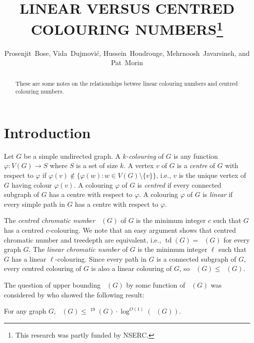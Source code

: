 \documentclass{patmorin}
\title{\MakeUppercase{Linear versus centred Colouring Numbers}\thanks{This research was partly funded by NSERC.}}
\author{Prosenjit~Bose, Vida~Dujmović, Hussein~Houdrouge, Mehrnoosh~Javarsineh, and Pat~Morin}
\date{}
\DeclareMathOperator{\td}{td}
\DeclareMathOperator{\chicen}{\chi_{\mathrm{cen}}}
\DeclareMathOperator{\chilin}{\chi_{\mathrm{lin}}}
\begin{document}
\maketitle
\renewcommand{\E}{\mathbb{E}}
\renewcommand{\Pr}{\mathbb{P}}

\begin{abstract}
    These are some notes on the relationships betwee linear colouring numbers and centred colouring numbers.
\end{abstract}

\section{Introduction}

Let $G$ be a simple undirected graph.  A \emph{$k$-colouring} of $G$ is any function $\varphi:V(G)\to S$ where $S$ is a set of size $k$.  A vertex $v$ of $G$ is a \emph{centre} of $G$ with respect to $\varphi$ if $\varphi(v)\not\in\{\varphi(w):w\in V(G)\setminus\{v\}\}$, i.e., $v$ is the unique vertex of $G$ having colour $\varphi(v)$.  A colouring $\varphi$ of $G$ is \emph{centred} if every connected subgraph of $G$ has a centre with respect to $\varphi$. A colouring $\varphi$ of $G$ is \emph{linear} if every simple path in $G$ has a centre with respect to $\varphi$.

The \emph{centred chromatic number} $\chicen(G)$ of $G$ is the minimum integer $c$ such that $G$ has a centred $c$-colouring.  We note that an easy argument shows that centred chromatic number and treedepth are equivalent, i.e., $\td(G)=\chicen(G)$ for every graph $G$. The \emph{linear chromatic number} of $G$ is the minimum integer $\ell$ such that $G$ has a linear $\ell$-colouring.  Since every path in $G$ is a connected subgraph of $G$, every centred colouring of $G$ is also a linear colouring of $G$, so $\chilin(G)\le\chicen(G)$.

The question of upper bounding $\chicen(G)$ by some function of $\chilin(G)$ was considered by \citet[Theorem~1]{kun.obrien.ea:polynomial} who showed the following result:

\begin{thm}\label{kun_obrien_general}
  For any graph $G$, $\chicen(G)\le \chilin^{19}(G)\cdot\log^{O(1)}(\chilin(G))$.
\end{thm}
\end{document}
